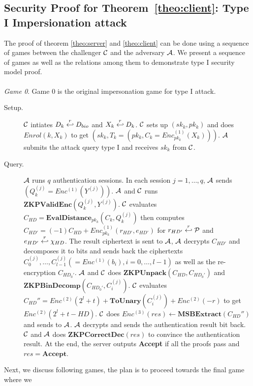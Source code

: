 \subsection{Security Proof for Theorem~\ref{theo:client}: Type I Impersionation attack}
The proof of theorem \ref{theo:server} and  \ref{theo:client} can be done using a sequence of games between the challenger $\mathcal{C}$ and the adversary $\mathcal{A}$. We present
a sequence of games as well as the relations among them to demonstrate type I security model proof.\\\\
\textit{Game 0}. Game 0 is the original impersonation game for type I attack.
\begin{description}
	\item [Setup.] $\mathcal{C}$ intiates $D_k \stackrel{r}{\hookleftarrow} D_{bio}$ and $X_k
	\stackrel{r}{\hookleftarrow} D_k$. $\mathcal{C}$ sets up $(sk_k, pk_k)$ and does
	$Enrol(k, X_k)$ to get $(sk_k, T_k =(pk_k, C_k = Enc^{(1)}_{pk_k}(X_k)))$.
	$\mathcal{A}$ submits the attack query type I and receives $sk_k$ from
	$\mathcal{C}$.
	\item [Query.] $\mathcal{A}$ runs $q$ authentication sessions. In each session $j
	= 1, \dots, q$,
	$\mathcal{A}$ sends $(Q_k^{(j)} = Enc^{(1)}(Y^{(j)}))$. $\mathcal{A}$ and
	$\mathcal{C}$ runs $\mathbf{ZKPValidEnc}(Q_k^{(j)},Y^{(j)})$. $\mathcal{C}$ evaluates
	$C_{HD} = \mathbf{EvalDistance}_{pk_k}(C_k, Q_k^{(j)})$ then computes
	$C_{HD'} = (-1)C_{HD} + Enc_{pk_k}^{(1)}(r_{HD'},e_{HD'})$ for $r_{HD'}
	\stackrel{r}{\hookleftarrow} \mathcal{P}$ and $e_{HD'} \stackrel{r}{\hookleftarrow} \chi_{HD}$. The
	result ciphertext is sent to $\mathcal{A}$, $\mathcal{A}$ decrypts $C_{HD'}$
	and decomposes it to bits and sends back the ciphertexts $C_0^{(j)}, \dots,
	C_{l-1}^{(j)} (= Enc^{(1)}(b_i), i = 0,\dots, l-1)$ as well as the
	re-encryption $C_{HD_0'}$. $\mathcal{A}$ and $\mathcal{C}$ does
	$\mathbf{ZKPUnpack}(C_{HD},C_{HD_0'})$ and $\mathbf{ZKPBinDecomp}(C_{HD_0'},
	C_i^{(j)})$.
	$\mathcal{C}$ evaluates $C_{HD}'' = Enc^{(2)}(2^l + t) +
	\mathbf{ToUnary}(C_i^{(j)}) + Enc^{(2)}(-r) $ to get $Enc^{(2)}(2^l + t -
	HD)$. $\mathcal{C}$ does $Enc^{(3)}(res) \gets
	\mathbf{MSBExtract}(C_{HD}'')$ and sends to $\mathcal{A}$. $\mathcal{A}$
	decrypts and sends the authentication result bit back. $\mathcal{C}$ and
	$\mathcal{A}$ does $\mathbf{ZKPCorrectDec}(res)$ to convince the
	authentication result. At the end, the server outputs \textbf{Accept} if
	all the proofs pass and $res = \mathbf{Accept}$.
\end{description}
Next, we discuss following games, the plan is to proceed towards the final game where we
